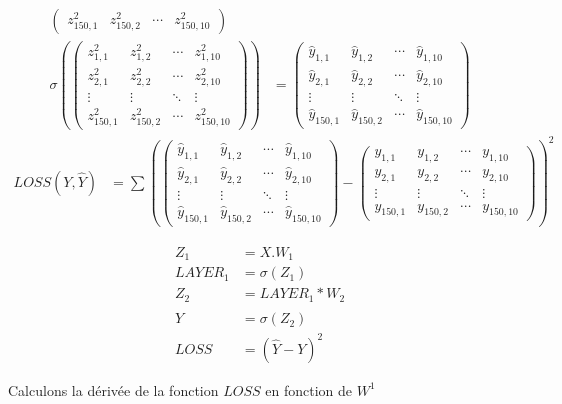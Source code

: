 \documentclass[11pt]{book}
\begin{document}
\begin{footnotesize}
\begin{align*}
\begin{pmatrix}
z^2_{150,1} & z^2_{150,2} & \cdots & z^2_{150,10} 
\end{pmatrix}
\\
\sigma(
\begin{pmatrix}
z^2_{1,1} & z^2_{1,2} & \cdots & z^2_{1,10} \\
z^2_{2,1} & z^2_{2,2} & \cdots & z^2_{2,10} \\
\vdots  & \vdots  & \ddots & \vdots  \\
z^2_{150,1} & z^2_{150,2} & \cdots & z^2_{150,10}
\end{pmatrix}
)
&=
\begin{pmatrix}
\hat{y}_{1,1} & \hat{y}_{1,2} & \cdots & \hat{y}_{1,10} \\
\hat{y}_{2,1} & \hat{y}_{2,2} & \cdots & \hat{y}_{2,10} \\
\vdots  & \vdots  & \ddots & \vdots  \\
\hat{y}_{150,1} & \hat{y}_{150,2} & \cdots & \hat{y}_{150,10} 
\end{pmatrix}
\end{align*}
\begin{align*}
LOSS(Y, \hat{Y}) &= \sum (
\begin{pmatrix}
\hat{y}_{1,1} & \hat{y}_{1,2} & \cdots & \hat{y}_{1,10} \\
\hat{y}_{2,1} & \hat{y}_{2,2} & \cdots & \hat{y}_{2,10} \\
\vdots  & \vdots  & \ddots & \vdots  \\
\hat{y}_{150,1} & \hat{y}_{150,2} & \cdots & \hat{y}_{150,10} 
\end{pmatrix}
-
\begin{pmatrix}
y_{1,1} & y_{1,2} & \cdots & y_{1,10} \\
y_{2,1} & y_{2,2} & \cdots & y_{2,10} \\
\vdots  & \vdots  & \ddots & \vdots  \\
y_{150,1} & y_{150,2} & \cdots & y_{150,10} 
\end{pmatrix}
)^2
\end{align*}

\begin{align*}
Z_1 &= X.W_1 \\
LAYER_1 &= \sigma (Z_1) \\
Z_2 &= LAYER_1 * W_2 \\
\hat{Y} &= \sigma (Z_2) \\
LOSS &= (\hat{Y} -Y)^2  
\end{align*}
\end{footnotesize}

Calculons la dérivée de la fonction $LOSS$ en fonction de $W^1$
\end{document}
